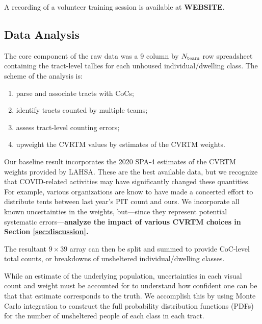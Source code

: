 \documentclass[11pt,twocolumn]{article}
\def\bfr{\bf\color{red}}
\begin{document}
A recording of a volunteer training session is available at {\bfr WEBSITE}.

\subsection{Data Analysis}
\label{sec:analysis}

The core component of the raw data was a 9 column by $N_{\rm team}$ row spreadsheet containing the
tract-level tallies for each unhoused individual/dwelling class. The scheme of the analysis is:
\begin{enumerate}
	\item parse and associate tracts with CoCs;
	\item identify tracts counted by multiple teams;
	\item assess tract-level counting errors;
	\item upweight the CVRTM values by estimates of the CVRTM weights.
\end{enumerate}

Our baseline result incorporates the 2020 SPA-4 estimates of the CVRTM weights provided
by LAHSA. These are the best available data, but we recognize that COVID-related activities 
may have significantly changed these quantities. For example, various organizations are know to
have made a concerted effort to distribute tents between last year's PIT count and ours. We 
incorporate all known uncertainties in the weights, but---since they represent potential systematic 
errors---{\bfr analyze the impact of various CVRTM choices in Section \ref{sec:discussion}.}

The resultant $9\times39$ array can then be split and summed to provide CoC-level total counts, 
or breakdowns of unsheltered individual/dwelling classes.

While an estimate of the underlying population, uncertainties in each visual count and weight 
must be accounted for to understand how confident one can be that that estimate corresponds to
the truth. We accomplish this by using Monte Carlo integration to construct the full probability
distribution functions (PDFs) for the number of unsheltered people of each class in each tract.

%
%
\end{document}
